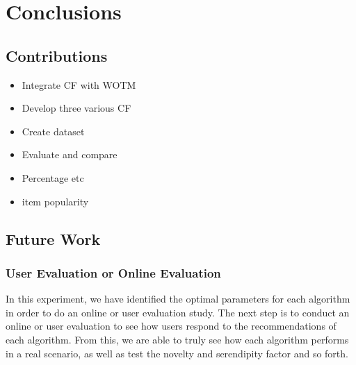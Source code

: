 \chapter{Conclusions}\label{C:con}

\section{Contributions}
\begin{itemize}
	\item{Integrate CF with WOTM}
	\item{Develop three various CF}
	\item{Create dataset}
	\item{Evaluate and compare}
	\item{Percentage etc}
	\item{item popularity}
\end{itemize}

\section{Future Work}


\subsection{User Evaluation or Online Evaluation}
In this experiment, we have identified the optimal parameters for each algorithm in order to do an online or user evaluation study. The next step is to conduct an online or user evaluation to see how users respond to the recommendations of each algorithm. From this, we are able to truly see how each algorithm performs in a real scenario, as well as test the novelty and serendipity factor and so forth. 

